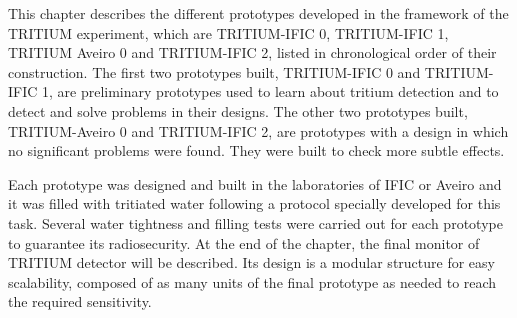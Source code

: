 This chapter describes the different prototypes developed in the framework of the TRITIUM experiment, which are TRITIUM-IFIC 0, TRITIUM-IFIC 1, TRITIUM Aveiro 0 and TRITIUM-IFIC 2, listed in chronological order of their construction. The first two prototypes built, TRITIUM-IFIC 0 and TRITIUM-IFIC 1, are preliminary prototypes used to learn about tritium detection and to detect and solve problems in their designs. The other two prototypes built, TRITIUM-Aveiro 0 and TRITIUM-IFIC 2, are prototypes with a design in which no significant problems were found. They were built to check more subtle effects. 

Each prototype was designed and built in the laboratories of IFIC or Aveiro and it was filled with tritiated water following a protocol specially developed for this task. Several water tightness and filling tests were carried out for each prototype to guarantee its radiosecurity. At the end of the chapter, the final monitor of TRITIUM detector will be described. Its design is a modular structure for easy scalability, composed of as many units of the final prototype as needed to reach the required sensitivity.
